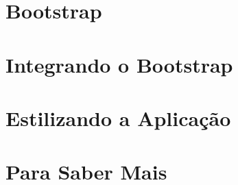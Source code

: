 \documentclass[t, 				             
			   final,
			   12pt, 				         
			   xcolor={usenames,dvipsnames}, 
			   table]{beamer}
\begin{document}
	
	
	  	

  \section{Bootstrap}
		
	
	\section{Integrando o Bootstrap}
		

	\section{Estilizando a Aplicação}
		
		
		
		
		

  	\section{Para Saber Mais}
		
\end{document}
